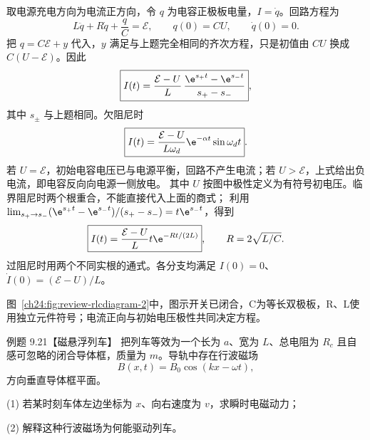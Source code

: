 \begin{xesolution}
取电源充电方向为电流正方向，令 $q$ 为电容正极板电量，$I=\dot q$。回路方程为
\begin{equation}
  L\ddot q+R\dot q+\frac qC=\mathcal E,
  \qquad q(0)=CU,
  \qquad \dot q(0)=0.
\end{equation}
把 $q=C\mathcal E+y$ 代入，$y$ 满足与上题完全相同的齐次方程，只是初值由 $CU$ 换成 $C(U-\mathcal E)$。因此
\begin{equation}
  \boxed{I(t)=\frac{\mathcal E-U}{L}\,
  \frac{\e^{s_+t}-\e^{s_-t}}{s_+-s_-}},
\end{equation}
其中 $s_\pm$ 与上题相同。欠阻尼时
\begin{equation}
  \boxed{I(t)=\frac{\mathcal E-U}{L\omega_d}
  \e^{-\alpha t}\sin\omega_dt}.
\end{equation}
若 $U=\mathcal E$，初始电容电压已与电源平衡，回路不产生电流；若 $U>\mathcal E$，上式给出负电流，即电容反向向电源一侧放电。
其中 $U$ 按图中极性定义为有符号初电压。临界阻尼时两个根重合，不能直接代入上面的商式；
利用 $\lim_{s_+\to s_-}(\e^{s_+t}-\e^{s_-t})/(s_+-s_-)=t\e^{s_-t}$，得到
\begin{equation}
 \boxed{I(t)=\frac{\mathcal E-U}{L}t\e^{-Rt/(2L)}},\qquad R=2\sqrt{L/C}.
\end{equation}
过阻尼时用两个不同实根的通式。各分支均满足 $I(0)=0$、$\dot I(0)=(\mathcal E-U)/L$。

图~\ref{ch24:fig:review-rlcdiagram-2}中，图示开关已闭合，C为等长双极板，R、L使用独立元件符号；电流正向与初始电压极性共同决定方程。

\end{xesolution}

\begin{origexamplebox}{例题 9.21【磁悬浮列车】}
把列车等效为一个长为 $a$、宽为 $L$、总电阻为 $R_c$ 且自感可忽略的闭合导体框，质量为 $m$。导轨中存在行波磁场
\begin{equation*}
  B(x,t)=B_0\cos(kx-\omega t),
\end{equation*}
方向垂直导体框平面。

(1) 若某时刻车体左边坐标为 $x$、向右速度为 $v$，求瞬时电磁动力；

(2) 解释这种行波磁场为何能驱动列车。
\begin{center}\end{center}
\label{fig:em24-question-21}

\end{origexamplebox}

